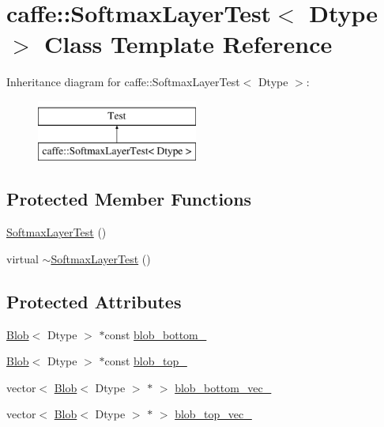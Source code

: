 \hypertarget{classcaffe_1_1_softmax_layer_test}{\section{caffe\+:\+:Softmax\+Layer\+Test$<$ Dtype $>$ Class Template Reference}
\label{classcaffe_1_1_softmax_layer_test}
}
Inheritance diagram for caffe\+:\+:Softmax\+Layer\+Test$<$ Dtype $>$\+:\begin{figure}[H]
\begin{center}
\leavevmode
\includegraphics[height=2.000000cm]{classcaffe_1_1_softmax_layer_test}
\end{center}
\end{figure}
\subsection*{Protected Member Functions}
\begin{DoxyCompactItemize}
\item 
\hyperlink{classcaffe_1_1_softmax_layer_test_a8c7d16eaa4952bde96fcddb6d1f5f457}{Softmax\+Layer\+Test} ()
\item 
virtual \hyperlink{classcaffe_1_1_softmax_layer_test_a3cff16f08a6a8b4f25554922e199ebbe}{$\sim$\+Softmax\+Layer\+Test} ()
\end{DoxyCompactItemize}
\subsection*{Protected Attributes}
\begin{DoxyCompactItemize}
\item 
\hyperlink{classcaffe_1_1_blob}{Blob}$<$ Dtype $>$ $\ast$const \hyperlink{classcaffe_1_1_softmax_layer_test_af6ec627c500885a0105e108177d53c29}{blob\+\_\+bottom\+\_\+}
\item 
\hyperlink{classcaffe_1_1_blob}{Blob}$<$ Dtype $>$ $\ast$const \hyperlink{classcaffe_1_1_softmax_layer_test_a17d658a69bbf19a3db4f1892b1997498}{blob\+\_\+top\+\_\+}
\item 
vector$<$ \hyperlink{classcaffe_1_1_blob}{Blob}$<$ Dtype $>$ $\ast$ $>$ \hyperlink{classcaffe_1_1_softmax_layer_test_a40cb6f5f51ea1017b8f4dd2591dcbdd8}{blob\+\_\+bottom\+\_\+vec\+\_\+}
\item 
vector$<$ \hyperlink{classcaffe_1_1_blob}{Blob}$<$ Dtype $>$ $\ast$ $>$ \hyperlink{classcaffe_1_1_softmax_layer_test_ae0fe3f4a4095998e002e305196dc3d9f}{blob\+\_\+top\+\_\+vec\+\_\+}
\end{DoxyCompactItemize}


